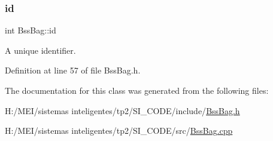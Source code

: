 \mbox{\label{class_bss_bag_ad4221d2f1212e092891726228fe7bf76}} 
\subsubsection{\texorpdfstring{id}{id}}
{\footnotesize\ttfamily int Bss\+Bag\+::id\hspace{0.3cm}{\ttfamily [protected]}}

A unique identifier. 

Definition at line 57 of file Bss\+Bag.\+h.



The documentation for this class was generated from the following files\+:\begin{DoxyCompactItemize}
\item 
H\+:/\+M\+E\+I/sistemas inteligentes/tp2/\+S\+I\+\_\+\+C\+O\+D\+E/include/\hyperlink{_bss_bag_8h}{Bss\+Bag.\+h}\item 
H\+:/\+M\+E\+I/sistemas inteligentes/tp2/\+S\+I\+\_\+\+C\+O\+D\+E/src/\hyperlink{_bss_bag_8cpp}{Bss\+Bag.\+cpp}\end{DoxyCompactItemize}
